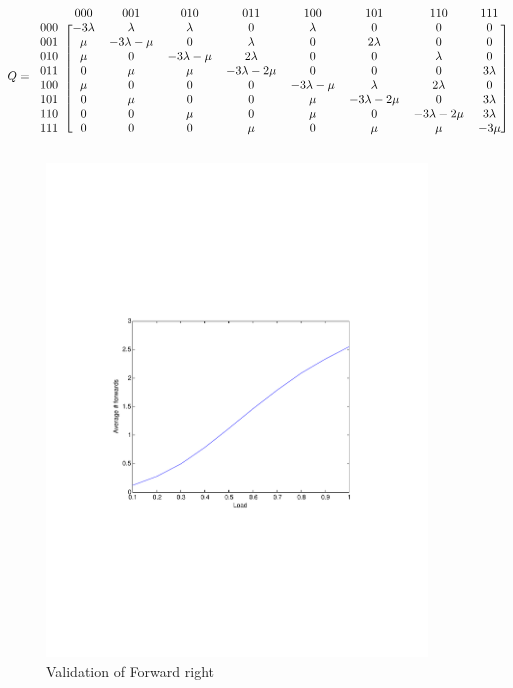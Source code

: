 \documentclass[10pt,a4paper]{article}
\begin{document}
\[ Q =
  \begin{blockarray}{ccccccccc}
    & 000 & 001 & 010 & 011 & 100 & 101 & 110 & 111 \\
    \begin{block}{c[cccccccc]}
    000 & -3 \lambda & \lambda & \lambda & 0 & \lambda & 0 & 0 & 0 \\
    001 & \mu & -3\lambda-\mu & 0 & \lambda & 0 & 2\lambda & 0 & 0 \\
    010 & \mu & 0 & -3\lambda-\mu & 2\lambda & 0 & 0 & \lambda & 0 \\
    011 & 0 & \mu & \mu & -3\lambda-2\mu & 0 & 0 & 0 & 3\lambda \\
    100 & \mu & 0 & 0 & 0 & -3\lambda-\mu & \lambda & 2\lambda & 0 \\
    101 & 0 & \mu & 0 & 0 & \mu & -3\lambda-2\mu & 0 & 3\lambda \\
    110 & 0 & 0 & \mu & 0 & \mu & 0 & -3\lambda-2\mu & 3\lambda \\
    111 & 0 & 0 & 0 & \mu & 0 & \mu & \mu & -3\mu \\
    \end{block}
  \end{blockarray}
\]

\begin{figure}[h!tb]
\centering
\includegraphics[clip=true, trim=9em 24em 9em 24em, width=0.9\textwidth]{resources/plotright.pdf}
\caption{Validation of Forward right}
\label{validright}
\end{figure}
\end{document}
